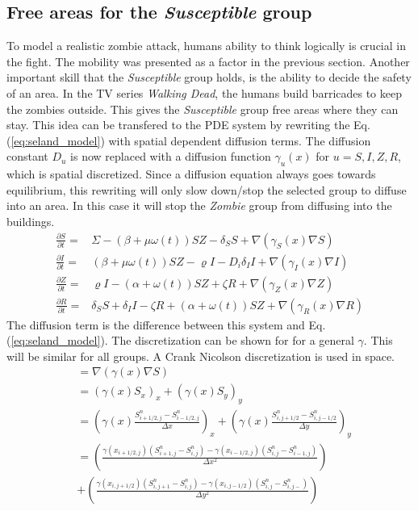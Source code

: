 \documentclass[%
twoside,                 %
final,                   %
chapterprefix=true,      %
open=right               %
10pt]{book}
\begin{document}
\subsection{Free areas for the \emph{Susceptible} group}
To model a realistic zombie attack, humans ability to think logically is crucial in the fight. The mobility was presented as a factor in the previous section. Another important skill that the \emph{Susceptible} group holds, is the ability to decide the safety of an area. In the TV series \emph{Walking Dead}, the humans build barricades to keep the zombies outside. This gives the \emph{Susceptible} group free areas where they can stay. This idea can be transfered to the PDE system by rewriting the Eq.(\ref{eq:seland_model}) with spatial dependent diffusion terms. The diffusion constant $D_u$ is now replaced with a diffusion function $\gamma_u(x)$ for $u= S,I,Z,R$, which is spatial discretized. Since a diffusion equation always goes towards equilibrium, this rewriting will only slow down/stop the selected group to diffuse into an area. In this case it will stop the \emph{Zombie} group from diffusing into the buildings. 
\begin{equation} \label{eq:seland_model_diff}
    \begin{aligned} 
    \frac{\partial S}{\partial t} =& \Sigma -(\beta+\mu \omega(t))SZ - \delta_SS +\nabla(\gamma_S(x) \nabla S) \\
    \frac{\partial I}{\partial t} =& (\beta+\mu \omega(t))SZ - \varrho I - D_i\delta_II+\nabla(\gamma_I(x) \nabla I)\\
    \frac{\partial Z}{\partial t} =& \varrho I- (\alpha+\omega(t))SZ + \zeta R+\nabla(\gamma_Z(x) \nabla Z)\\
    \frac{\partial R}{\partial t} =& \delta_SS +\delta_II -\zeta R + (\alpha+\omega(t))SZ+\nabla(\gamma_R(x) \nabla R) 
    \end{aligned}
\end{equation}
The diffusion term is the difference between this system and Eq.(\ref{eq:seland_model}). The discretization can be shown for for a general $\gamma$. This will be similar for all groups. A Crank Nicolson discretization is used in space.
\begin{equation} \label{eq:gamma}
    \begin{aligned}
    &=\nabla(\gamma(x) \nabla S) \\
    &=(\gamma(x) S_x)_x+(\gamma(x) S_y)_y \\
    &= \left(\gamma(x) \frac{S^{n}_{i+1/2,j}-S^{n}_{i-1/2,j}}{\Delta x}\right)_x+\left(\gamma(x) \frac{S^{n}_{i,j+1/2}-S^{n}_{i,j-1/2}}{\Delta y}\right)_y \\
    &= \left(\frac{\gamma(x_{i+1/2,j})(S^{n}_{i+1,j}-S^{n}_{i,j})-\gamma(x_{i-1/2,j})(S^{n}_{i,j}-S^{n}_{i-1,j})}{\Delta x^2}\right) \\
    &+ \left(\frac{\gamma(x_{i,j+1/2})(S^{n}_{i,j+1}-S^{n}_{i,j})-\gamma(x_{i,j-1/2})(S^{n}_{i,j}-S^{n}_{i,j-})}{\Delta y^2}\right)
    \end{aligned}
\end{equation}
\end{document}
